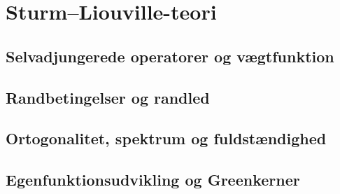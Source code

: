 \chapter{Sturm–Liouville-teori}
\section{Selvadjungerede operatorer og vægtfunktion}
\leavevmode\par

\section{Randbetingelser og randled}
\leavevmode\par

\section{Ortogonalitet, spektrum og fuldstændighed}
\leavevmode\par

\section{Egenfunktionsudvikling og Greenkerner}
\leavevmode\par
